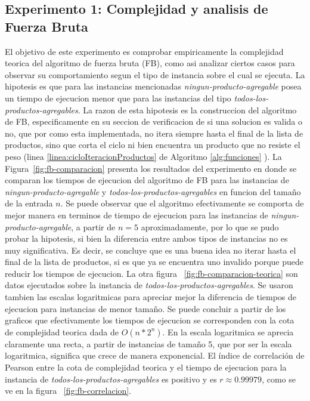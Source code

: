 \documentclass[10pt,a4paper]{article}
\begin{document}
\subsection{Experimento 1: Complejidad y analisis de Fuerza Bruta}
El objetivo de este experimento es comprobar empiricamente la complejidad teorica del algoritmo de fuerza bruta (FB), como asi analizar ciertos casos para observar su comportamiento segun el tipo de instancia sobre el cual se ejecuta. La hipotesis es que para las instancias mencionadas \textit{ningun-producto-agregable} posea un tiempo de ejecucion menor que para las instancias del tipo \textit{todos-los-productos-agregables}. La razon de esta hipotesis es la construccion del algoritmo de FB, especificamente en su seccion de verificacion de si una solucion es valida o no, que por como esta implementada, no itera siempre hasta el final de la lista de productos, sino que corta el ciclo ni bien encuentra un producto que no resiste el peso (linea \ref{linea:cicloIteracionProductos} de Algoritmo \ref{alg:funciones} ). 
La Figura~\ref{fig:fb-comparacion} presenta los resultados del experimento en donde se comparan los tiempos de ejecucion del algoritmo de FB para las instancias de  \textit{ningun-producto-agregable} y \textit{todos-los-productos-agregables} en funcion del tamaño de la entrada $n$. Se puede observar que el algoritmo efectivamente se comporta de mejor manera en terminos de tiempo de ejecucion para las instancias de \textit{ningun-producto-agregable}, a partir de $n = 5$ aproximadamente, por lo que se pudo probar la hipotesis, si bien la diferencia entre ambos tipos de instancias no es muy significativa. Es decir, se concluye que es una buena idea no iterar hasta el final de la lista de productos, si es que ya se encuentra uno invalido porque puede reducir los tiempos de ejecucion. 
La otra figura ~\ref{fig:fb-comparacion-teorica} son datos ejecutados sobre la instancia de \textit{todos-los-productos-agregables}. Se usaron tambien las escalas logaritmicas para apreciar mejor la diferencia de tiempos de ejecucion para instancias de menor tamaño. Se puede concluir a partir de los graficos que efectivamente los tiempos de ejecucion se corresponden con la cota de complejidad teorica dada de $O(n*2^n)$. En la escala logaritmica se aprecia claramente una recta, a partir de instancias de tamaño 5, que por ser la escala logaritmica, significa que crece de manera exponencial. El índice de correlación de Pearson entre la cota de complejidad teorica y el tiempo de ejecucion para la instancia de \textit{todos-los-productos-agregables} es positivo y es $r \approx 0.99979$, como se ve en la figura ~\ref{fig:fb-correlacion}.
\end{document}

